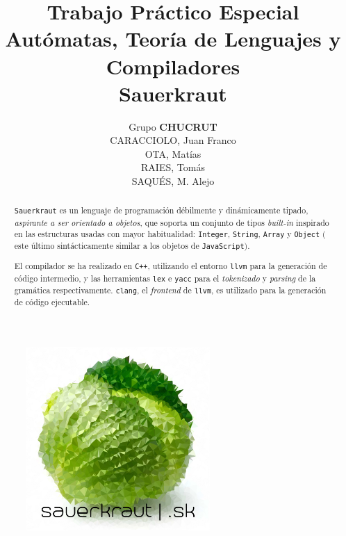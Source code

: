 \documentclass[12pt]{article}
\begin{document}
	\title{\textbf{Trabajo Práctico Especial}\\ Autómatas, Teoría de Lenguajes y Compiladores \\ \textbf{Sauerkraut}}
	\author{Grupo \textbf{CHUCRUT} \\ CARACCIOLO, Juan Franco \\ OTA, Matías \\ RAIES, Tomás \\ SAQUÉS, M. Alejo}
	\date{}
	\maketitle
	
	\begin{abstract}
		\verb|Sauerkraut| es un lenguaje de programación débilmente y dinámicamente tipado, \textit{aspirante a ser orientado a objetos}, que soporta un conjunto de tipos \textit{built-in} inspirado en las estructuras usadas con mayor habitualidad: \verb|Integer|, \verb|String|, \verb|Array| y \verb|Object| $($este último sintácticamente similar a los objetos de \verb|JavaScript|$)$.
		
		El compilador se ha realizado en \verb|C++|, utilizando el entorno \verb|llvm| para la generación de código intermedio, y las herramientas \verb|lex| e \verb|yacc| para el \textit{tokenizado} y \textit{parsing} de la gramática respectivamente. \verb|clang|, el \textit{frontend} de \verb|llvm|, es utilizado para la generación de código ejecutable.
	\end{abstract}
	
	\begin{figure}[h]
		\centering
		\includegraphics[width=7cm]{sklogo.png}
	\end{figure}
	
	
	\newpage
	
	\tableofcontents
	
\end{document}
